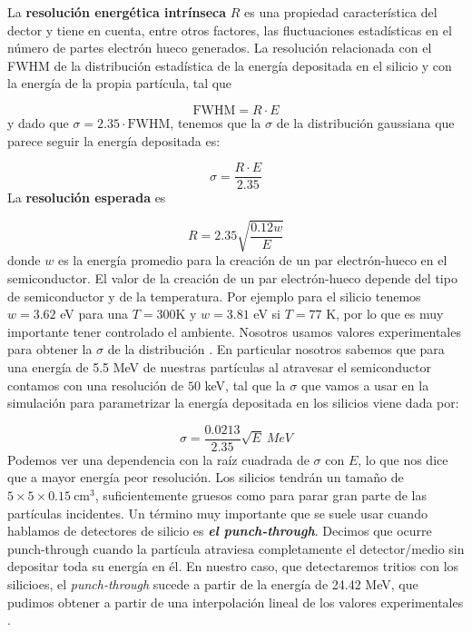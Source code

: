 La \textbf{resolución energética intrínseca} $R$ es una propiedad característica del dector y tiene en cuenta, entre otros factores, las fluctuaciones estadísticas en el número de partes electrón hueco generados. La resolución relacionada con el FWHM de la distribución estadística de la energía depositada en el silicio y con la energía de la propia partícula, tal que

\begin{equation}
	\text{FWHM} = R \cdot E
\end{equation}
y dado que $\sigma = 2.35 \cdot \text{FWHM} $, tenemos que la $\sigma$ de la distribución gaussiana que parece seguir la energía depositada es:

\begin{equation}
	\sigma  = \frac{R \cdot E}{2.35}
\end{equation}
La \textbf{resolución esperada} es \cite{Leo:302344}

\begin{equation}
	R = 2.35 \sqrt{\frac{0.12 w}{E}}
\end{equation}
donde \( w \) es la energía promedio para la creación de un par electrón-hueco en el semiconductor. El valor de la creación de un par electrón-hueco depende del tipo de semiconductor y de la temperatura. Por ejemplo para el silicio tenemos $w=3.62$ eV para una $T=$300K y $w=3.81$ eV si $T=77$ K, por lo que es muy importante tener controlado el ambiente. Nosotros usamos valores experimentales para obtener la $\sigma$ de la distribución \cite{Leo:302344}. En particular nosotros sabemos que para una energía de 5.5 MeV de nuestras partículas al atravesar el semiconductor contamos con una resolución de $50$ keV, tal que la $\sigma$ que vamos a usar en la simulación para parametrizar la energía depositada en los silicios viene dada por:

\begin{equation}
	\sigma = \frac{0.0213}{2.35} \sqrt{E} \ \unit{MeV} \label{Ec:03-resolucion}
\end{equation}
Podemos ver una dependencia con la raíz cuadrada de $\sigma$ con $E$, lo que nos dice que a mayor energía peor resolución. Los silicios tendrán un tamaño de $5 \times 5 \times 0.15 \ \text{cm}^{3}$, suficientemente gruesos como para parar gran parte de las partículas incidentes. Un término muy importante que se suele usar cuando hablamos de detectores de silicio es \textbf{\textit{el punch-through}}. Decimos que ocurre punch-through cuando la partícula atraviesa completamente el detector/medio sin depositar toda su energía en él.  En nuestro caso, que detectaremos tritios con los silicioes, el \textit{punch-through} sucede a partir de la energía de 24.42 MeV, que pudimos obtener a partir de una interpolación lineal de los valores experimentales \cite{ZIEGLER20101818}. 

